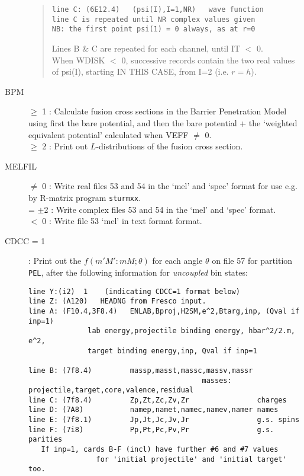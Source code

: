 \documentclass[11pt]{article}
\begin{document}
\begin{description}
\begin{quotation}
\begin{verbatim}
line C: (6E12.4)   (psi(I),I=1,NR)   wave function
line C is repeated until NR complex values given
NB: the first point psi(1) = 0 always, as at r=0
\end{verbatim}
Lines B \& C are repeated for each channel, until IT $<$ 0.
\\
When WDISK $<$ 0, successive records contain the two real values
of psi(I), starting IN THIS CASE, from I=2 (i.e. $r=h$).
\end{quotation}

\item[BPM]
  $\geq$ 1 : Calculate fusion cross sections in the Barrier Penetration
Model using first the bare potential, and then the bare potential + the
`weighted equivalent potential' calculated when VEFF $\neq$ 0.
\\  $\geq$ 2 : Print out $L$-distributions of the fusion cross section.

\item[MELFIL]
  $\ne$ 0 : Write real files 53 and 54 in the `mel' and `spec' format
        for use e.g. by R-matrix program {\tt sturmxx}.
\\  = $\pm$2 : Write complex files 53 and 54 in the `mel' and `spec' format.
\\   $<$ 0 : Write file 53 `mel' in text format format.

\item[CDCC = 1]:
Print out the $f(m'M':mM; \theta)$ for each angle $\theta$
on file 57 for partition {\tt PEL}, after the following information for {\em uncoupled} bin states:
{\footnotesize
\begin{verbatim}
line Y:(i2)  1    (indicating CDCC=1 format below)
line Z: (A120)   HEADNG from Fresco input.
line A: (F10.4,3F8.4)   ENLAB,Bproj,H2SM,e^2,Btarg,inp, (Qval if inp=1)
              lab energy,projectile binding energy, hbar^2/2.m, e^2, 
              target binding energy,inp, Qval if inp=1
                                                
line B: (7f8.4)         massp,masst,massc,massv,massr  
                                         masses: projectile,target,core,valence,residual
line C: (7f8.4)         Zp,Zt,Zc,Zv,Zr                charges
line D: (7A8)           namep,namet,namec,namev,namer names
line E: (7f8.1)         Jp,Jt,Jc,Jv,Jr                g.s. spins
line F: (7i8)           Pp,Pt,Pc,Pv,Pr                g.s. parities
   If inp=1, cards B-F (incl) have further #6 and #7 values 
                for 'initial projectile' and 'initial target' too.
   

\end{verbatim}}
\end{description}
\end{document}

